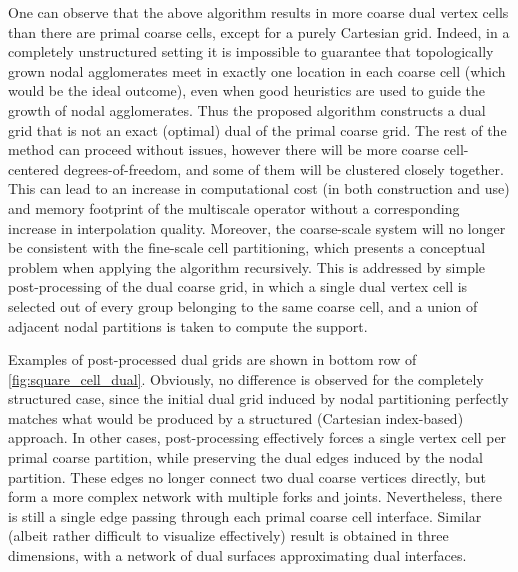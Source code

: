 One can observe that the above algorithm results in more coarse dual vertex cells than there are primal coarse cells, except for a purely Cartesian grid.   Indeed, in a completely unstructured setting it is impossible to guarantee that topologically grown nodal agglomerates meet in exactly one location in each coarse cell (which would be the ideal outcome), even when good heuristics are used to guide the growth of nodal agglomerates.   Thus the proposed algorithm constructs a dual grid that is not an exact (optimal) dual of the primal coarse grid.    The rest of the method can proceed without issues, however there will be more coarse cell-centered degrees-of-freedom, and some of them will be clustered closely together.   This can lead to an increase in computational cost (in both construction and use) and memory footprint of the multiscale operator without a corresponding increase in interpolation quality.   Moreover, the coarse-scale system will no longer be consistent with the fine-scale cell partitioning, which presents a conceptual problem when applying the algorithm recursively.    This is addressed by simple post-processing of the dual coarse grid, in which a single dual vertex cell is selected out of every group belonging to the same coarse cell, and a union of adjacent nodal partitions is taken to compute the support.

Examples of post-processed dual grids are shown in bottom row of \cref{fig:square_cell_dual}.   Obviously, no difference is observed for the completely structured case, since the initial dual grid induced by nodal partitioning perfectly matches what would be produced by a structured (Cartesian index-based) approach.   In other cases, post-processing effectively forces a single vertex cell per primal coarse partition, while preserving the dual edges induced by the nodal partition.   These edges no longer connect two dual coarse vertices directly, but form a more complex network with multiple forks and joints.   Nevertheless, there is still a single edge passing through each primal coarse cell interface.    Similar (albeit rather difficult to visualize effectively) result is obtained in three dimensions, with a network of dual surfaces approximating dual interfaces.

